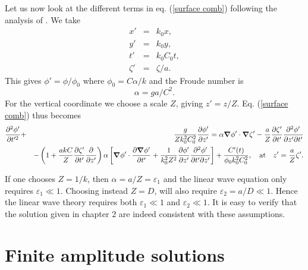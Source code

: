 Let us now look at the different terms in eq. (\ref{surface comb})
 following the analysis of \cite{Kirby1998}. We take 
 \begin{eqnarray}
  x'&=&k_0 x, \\
  y'&=& k_0 y, \\
  t'&=&k_0 C_0 t, \\
  \zeta'&=&\zeta/a.
 \end{eqnarray}
 This gives  $\phi'=\phi/\phi_0$
where $\phi_0= C \alpha /k$ and the Froude number is 
 \begin{equation}
\alpha=g a / C^2.
 \end{equation}
For the vertical coordinate we choose a scale  $Z$, giving $z'=z/Z$. 
Eq. (\ref{surface comb}) thus becomes 
\begin{eqnarray}
   \frac{\partial^2{\phi'}}{\partial{t'^2}}&+&\frac{g}{Z k_0^2 C_0^2} \frac{\partial\phi'}{\partial
   z'}=
\alpha  \mbox{\boldmath $\nabla$}\phi' \cdot \mbox{\boldmath $\nabla$}\zeta' - \frac{a}{Z} \frac{\partial
\zeta'}{\partial t'}\frac{\partial^2 \phi'}{\partial z' \partial t'}
\nonumber\\
& &- \left(1+\frac{akC}{Z} \frac{\partial \zeta'}{\partial t'}\frac{\partial
}{\partial z'}\right) \alpha \left[\mbox{\boldmath $\nabla$}\phi' \cdot
\frac{\partial{\mbox{\boldmath $\nabla$}\phi'}}{\partial t'} + \frac{1}{k_0^2 Z^2}
\frac{\partial\phi'}{\partial z'}\frac{\partial^2\phi'}{\partial t'\partial
z'}\right]+\frac{C'(t)}{\phi_0 k_0^2 C_0^2}, \quad \mbox{at} \quad
z'=\frac{a}{Z}\zeta'. \nonumber\\ \label{surface comb_scale}
\end{eqnarray}

If one chooses $Z=1/k$, then $\alpha=a/Z=\varepsilon_1$ and the linear wave equation only requires  $\varepsilon_1 \ll 1$. Choosing instead $Z=D$, will also require $\varepsilon_2=a/D \ll 1$. 
Hence the linear wave theory requires both $\varepsilon_1 \ll 1$  and $\varepsilon_2 \ll 1$. It is easy to verify that the solution given in chapter 2 %
are indeed consistent with these assumptions.




\section{Finite amplitude solutions}\label{ch_nonlin_per}
